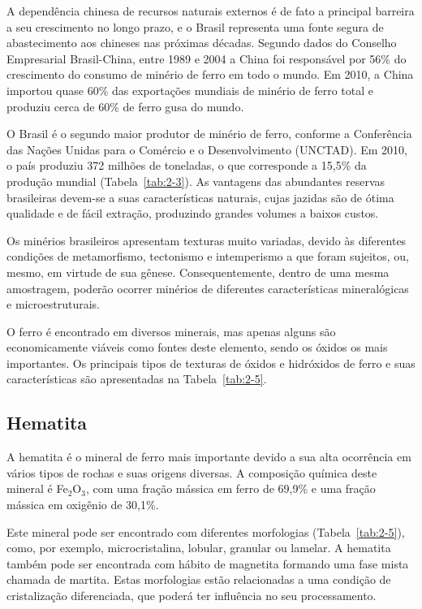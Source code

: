 A dependência chinesa de recursos naturais externos é de fato a
principal barreira a seu crescimento no longo prazo, e o Brasil
representa uma fonte segura de abastecimento aos chineses nas próximas
décadas. Segundo dados do Conselho Empresarial Brasil-China, entre
1989 e 2004 a China foi responsável por 56\% do crescimento do consumo
de minério de ferro em todo o mundo. Em 2010, a China importou quase
60\% das exportações mundiais de minério de ferro total e produziu
cerca de 60\% de ferro gusa do mundo.\cite{25}

O Brasil é o segundo maior produtor de minério de ferro, conforme a
Conferência das Nações Unidas para o Comércio e o Desenvolvimento
(\uppercase{Unctad}).  Em 2010, o país produziu 372 milhões de
toneladas, o que corresponde a 15,5\% da produção mundial
(Tabela~\ref{tab:2-3}).\cite{20} As vantagens das abundantes reservas
brasileiras devem-se a suas características naturais, cujas jazidas
são de ótima qualidade e de fácil extração, produzindo grandes volumes
a baixos custos.



Os minérios brasileiros apresentam texturas muito variadas, devido às
diferentes condições de metamorfismo, tectonismo e intemperismo a que
foram sujeitos, ou, mesmo, em virtude de sua gênese. Consequentemente,
dentro de uma mesma amostragem, poderão ocorrer minérios de diferentes
características mineralógicas e microestruturais.\cite{10,26,27}

O ferro é encontrado em diversos minerais, mas apenas alguns são
economicamente viáveis como fontes deste elemento, sendo os óxidos os
mais importantes.\cite{28,29} Os principais tipos de texturas de
óxidos e hidróxidos de ferro e suas características são apresentadas
na Tabela~\ref{tab:2-5}.\cite{14}

%


\subsection{Hematita}

A hematita é o mineral de ferro mais importante devido a sua alta
ocorrência em vários tipos de rochas e suas origens diversas.\cite{30}
A composição química deste mineral é Fe$_{2}$O$_{3}$, com uma fração
mássica em ferro de 69,9\% e uma fração mássica em oxigênio de
30,1\%.\cite{31}

Este mineral pode ser encontrado com diferentes morfologias
(Tabela~\ref{tab:2-5}), como, por exemplo, microcristalina, lobular,
granular ou lamelar. A hematita também pode ser encontrada com hábito
de magnetita formando uma fase mista chamada de martita.\cite{2,14}
Estas morfologias estão relacionadas a uma condição de cristalização
diferenciada, que poderá ter influência no seu processamento.\cite{26}

